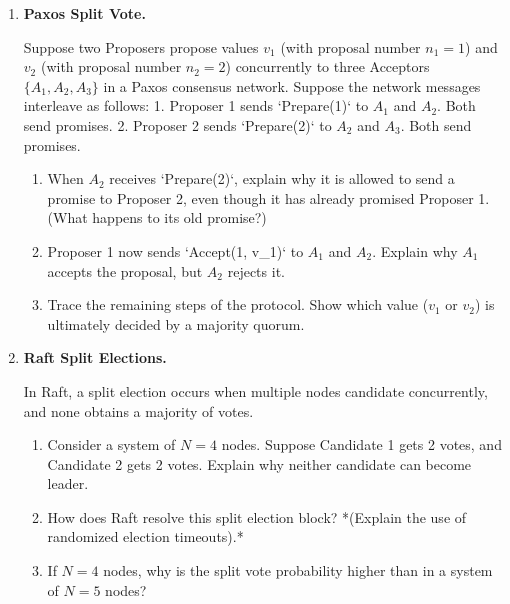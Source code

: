 \documentclass[12pt, a4paper]{book}
\begin{document}
\begin{problembox}
\begin{enumerate}[label=\textbf{P\arabic*.}]
  \item \textbf{Paxos Split Vote.}
  
        Suppose two Proposers propose values $v_1$ (with proposal number $n_1 = 1$) and $v_2$ (with proposal number $n_2 = 2$) concurrently to three Acceptors $\{A_1, A_2, A_3\}$ in a Paxos consensus network.
        Suppose the network messages interleave as follows:
        1. Proposer 1 sends `Prepare(1)` to $A_1$ and $A_2$. Both send promises.
        2. Proposer 2 sends `Prepare(2)` to $A_2$ and $A_3$. Both send promises.
        \begin{enumerate}[label=(\alph*)]
          \item When $A_2$ receives `Prepare(2)`, explain why it is allowed to send a promise to Proposer 2, even though it has already promised Proposer 1. (What happens to its old promise?)
          \item Proposer 1 now sends `Accept(1, v_1)` to $A_1$ and $A_2$.
                Explain why $A_1$ accepts the proposal, but $A_2$ rejects it.
          \item Trace the remaining steps of the protocol. Show which value ($v_1$ or $v_2$) is ultimately decided by a majority quorum.
        \end{enumerate}

  \item \textbf{Raft Split Elections.}
  
        In Raft, a split election occurs when multiple nodes candidate concurrently, and none obtains a majority of votes.
        \begin{enumerate}[label=(\alph*)]
          \item Consider a system of $N = 4$ nodes.
                Suppose Candidate 1 gets 2 votes, and Candidate 2 gets 2 votes.
                Explain why neither candidate can become leader.
          \item How does Raft resolve this split election block?
                *(Explain the use of randomized election timeouts).*
          \item If $N = 4$ nodes, why is the split vote probability higher than in a system of $N = 5$ nodes?
        \end{enumerate}
\end{enumerate}
\end{problembox}

\newpage
\end{document}
